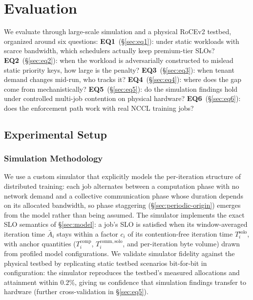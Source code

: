 \section{Evaluation}
\label{sec:eval}

We evaluate \Name through large-scale simulation and a physical RoCEv2 testbed, organized around six questions: \textbf{EQ1}~(\S\ref{sec:eq1}): under static workloads with scarce bandwidth, which schedulers actually keep premium-tier SLOs? \textbf{EQ2}~(\S\ref{sec:eq2}): when the workload is adversarially constructed to mislead static priority keys, how large is the penalty? \textbf{EQ3}~(\S\ref{sec:eq3}): when tenant demand changes mid-run, who tracks it? \textbf{EQ4}~(\S\ref{sec:eq4}): where does the gap come from mechanistically? \textbf{EQ5}~(\S\ref{sec:eq5}): do the simulation findings hold under controlled multi-job contention on physical hardware? \textbf{EQ6}~(\S\ref{sec:eq6}): does the enforcement path work with real NCCL training jobs?

\subsection{Experimental Setup}
\label{sec:setup}

\subsubsection{Simulation Methodology}
\label{sec:sim-method}

We use a custom simulator that explicitly models the per-iteration structure of distributed training: each job alternates between a computation phase with no network demand and a collective communication phase whose duration depends on its allocated bandwidth, so phase staggering (\S\ref{sec:periodic-origin}) emerges from the model rather than being assumed. The simulator implements the exact SLO semantics of \S\ref{sec:model}: a job's SLO is satisfied when its window-averaged iteration time $\bar{A}_i$ stays within a factor $c_i$ of its contention-free iteration time $T_i^{\mathrm{solo}}$, with anchor quantities ($T_i^{\mathrm{comp}}$, $T_i^{\mathrm{comm,solo}}$, and per-iteration byte volume) drawn from profiled model configurations. We validate simulator fidelity against the physical testbed by replicating static testbed scenarios bit-for-bit in configuration: the simulator reproduces the testbed's measured allocations and attainment within $0.2\%$, giving us confidence that simulation findings transfer to hardware (further cross-validation in \S\ref{sec:eq5}).

